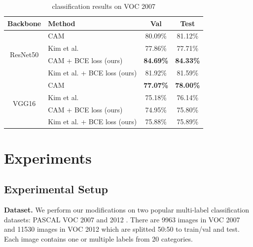 \documentclass[conference]{IEEEtran}
\begin{document}
\begin{table}[t]
    \centering
    \caption{classification results on VOC 2007}
    \label{tab:classification_map_voc_2007}
    \begin{tabular}{|c|l|c|c|}
        \hline
        Backbone                     & Method                                              & Val                             & Test                            \\
        \hline
        \multirow[c]{4}{*}{ResNet50} & CAM\cite{zhou2015cnnlocalization}                   & 80.09\%                         & 81.12\%                         \\
                                     & Kim et al. \cite{kim2022bridging}                   & 77.86\%                         & 77.71\%                         \\
                                     & CAM\cite{zhou2015cnnlocalization} + BCE loss (ours) & \color{red} \bfseries{84.69\%}  & \color{red} \bfseries{84.33\%}  \\
                                     & Kim et al. \cite{kim2022bridging} + BCE loss (ours) & 81.92\%                         & 81.59\%                         \\
        \hline
        \multirow[c]{4}{*}{VGG16}    & CAM\cite{zhou2015cnnlocalization}                   & \color{blue} \bfseries{77.07\%} & \color{blue} \bfseries{78.00\%} \\
                                     & Kim et al. \cite{kim2022bridging}                   & 75.18\%                         & 76.14\%                         \\
                                     & CAM\cite{zhou2015cnnlocalization} + BCE loss (ours) & 74.95\%                         & 75.80\%                         \\
                                     & Kim et al. \cite{kim2022bridging} + BCE loss (ours) & 75.88\%                         & 75.89\%                         \\
        \hline
    \end{tabular}
\end{table}

\section{Experiments}
\subsection{Experimental Setup}
\textbf{Dataset.} We perform our modifications on two popular multi-label classification datasets: PASCAL VOC 2007 \cite{pascal-voc-2007} and 2012 \cite{pascal-voc-2012}. There are \num{9963} images in VOC 2007 and \num{11530} images in VOC 2012 which are splitted 50:50 to train/val and test.  Each image contains one or multiple labels from 20 categories.
\end{document}
